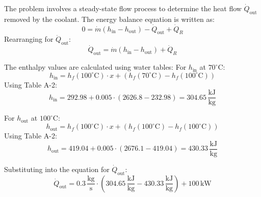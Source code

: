 The problem involves a steady-state flow process to determine the heat flow \( \dot{Q}_{\text{out}} \) removed by the coolant. The energy balance equation is written as:  
\[
0 = \dot{m} \left( h_{\text{in}} - h_{\text{out}} \right) - \dot{Q}_{\text{out}} + \dot{Q}_R
\]  
Rearranging for \( \dot{Q}_{\text{out}} \):  
\[
\dot{Q}_{\text{out}} = \dot{m} \left( h_{\text{in}} - h_{\text{out}} \right) + \dot{Q}_R
\]  

The enthalpy values are calculated using water tables:  
For \( h_{\text{in}} \) at \( 70^\circ\text{C} \):  
\[
h_{\text{in}} = h_f(100^\circ\text{C}) \cdot x + \left( h_f(70^\circ\text{C}) - h_f(100^\circ\text{C}) \right)
\]  
Using Table A-2:  
\[
h_{\text{in}} = 292.98 + 0.005 \cdot \left( 2626.8 - 232.98 \right) = 304.65 \, \frac{\text{kJ}}{\text{kg}}
\]  

For \( h_{\text{out}} \) at \( 100^\circ\text{C} \):  
\[
h_{\text{out}} = h_f(100^\circ\text{C}) \cdot x + \left( h_f(100^\circ\text{C}) - h_f(100^\circ\text{C}) \right)
\]  
Using Table A-2:  
\[
h_{\text{out}} = 419.04 + 0.005 \cdot \left( 2676.1 - 419.04 \right) = 430.33 \, \frac{\text{kJ}}{\text{kg}}
\]  

Substituting into the equation for \( \dot{Q}_{\text{out}} \):  
\[
\dot{Q}_{\text{out}} = 0.3 \, \frac{\text{kg}}{\text{s}} \cdot \left( 304.65 \, \frac{\text{kJ}}{\text{kg}} - 430.33 \, \frac{\text{kJ}}{\text{kg}} \right) + 100 \, \text{kW}
\]